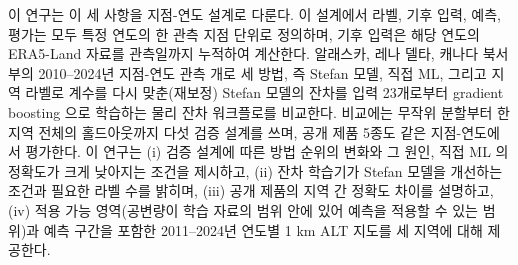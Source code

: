 이 연구는 이 세 사항을 지점-연도 설계로 다룬다. 이 설계에서 라벨, 기후 입력, 예측, 평가는 모두 특정 연도의 한 관측 지점 단위로 정의하며, 기후 입력은 해당 연도의 ERA5-Land 자료를 관측일까지 누적하여 계산한다\cite{munozsabater2021_era5_land}. 알래스카, 레나 델타, 캐나다 북서부의 2010--2024년 지점-연도 관측 \nncyAll{}개로 세 방법, 즉 Stefan 모델, 직접 ML, 그리고 지역 라벨로 계수를 다시 맞춘(재보정) Stefan 모델의 잔차를 입력 23개로부터 gradient boosting 으로 학습하는 물리 잔차 워크플로를 비교한다. 비교에는 무작위 분할부터 한 지역 전체의 홀드아웃까지 다섯 검증 설계를 쓰며, 공개 제품 5종도 같은 지점-연도에서 평가한다. 이 연구는 (i) 검증 설계에 따른 방법 순위의 변화와 그 원인, 직접 ML 의 정확도가 크게 낮아지는 조건을 제시하고, (ii) 잔차 학습기가 Stefan 모델을 개선하는 조건과 필요한 라벨 수를 밝히며, (iii) 공개 제품의 지역 간 정확도 차이를 설명하고, (iv) 적용 가능 영역(공변량이 학습 자료의 범위 안에 있어 예측을 적용할 수 있는 범위)과 예측 구간을 포함한 2011--2024년 연도별 1 km ALT 지도를 세 지역에 대해 제공한다.
